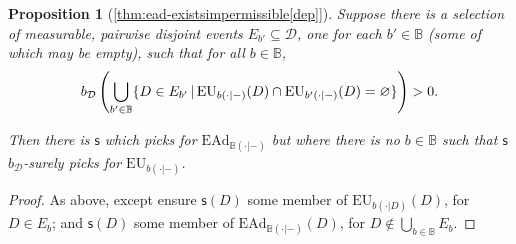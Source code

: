 \documentclass[a4paper,final]{article}
\newtheorem{theorem}{Theorem}[section]
\newtheorem{proposition}[theorem]{Proposition}
\newtheorem{lemma}[theorem]{Lemma}
\renewcommand\P{\mathbb{P}} %
\newcommand\EU{\mathrm{EU}}
\newcommand\EAd{\mathrm{EAd}}
\newcommand{\Decs}{\mathcal{D}}
\newcommand\s{\mathsf{s}}
\newcommand{\IB}{\mathbb{B}}
\newcommand{\IP}{\P}
\newcommand\SetDelimiter[1][]{
	\nonscript\,#1\vert \allowbreak \nonscript\,\mathopen{}}
\providecommand\given{\SetDelimiter}
\renewcommand{\emptyset}{\varnothing}
\renewcommand{\geq}{\geqslant}
\newenvironment{CCM rewritten}
{\begingroup\color{blue}} %
{\endgroup}              %
\begin{document}
%	
%	
%	
%
%
%

\begin{proposition}[\cref{thm:ead-existsimpermissible[dep]}]
Suppose there is a selection of measurable, pairwise disjoint events $E_{b'}\subseteq\Decs$, one for each $b'\in\IB$ (some of which may be empty),  such that for all $b\in\IB$, $$b_\Decs\left(\bigcup_{b'\in\IB}\{D\in E_{b'}\given \EU_{b(\cdot|-)}(D)\cap \EU_{b'(\cdot|-)}(D)=\emptyset\}\right)>0.$$

Then there is $\s$ which picks for $\EAd_{\IB(\cdot|-)}$ but where there is no $b\in\IB$ such that $\s$  $b_\Decs$-surely picks for $\EU_{b(\cdot|-)}$. 
\end{proposition}
\begin{proof}
	As above, except ensure $\s(D)$ some member of $\EU_{b(\cdot|D)}(D)$, for $D\in E_b$; and $\s(D)$ some member of $\EAd_{\IB(\cdot|-)}(D)$, for $D \notin \bigcup_{b\in\IB}E_b$. 
\end{proof}
\end{document}

